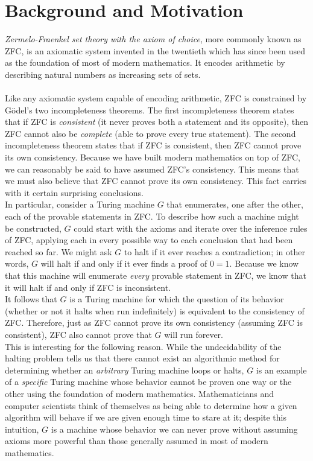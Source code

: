 \documentclass[11pt]{report}
\begin{document}
\section{Background and Motivation \label{sec:background}}

\emph{Zermelo-Fraenkel set theory with the axiom of choice}, more commonly known as ZFC, is an axiomatic system invented in the twentieth which has since been used as the foundation of most of modern mathematics. It encodes arithmetic by describing natural numbers as increasing sets of sets. \\
\\
Like any axiomatic system capable of encoding arithmetic, ZFC is constrained by G\"{o}del's two incompleteness theorems. The first incompleteness theorem states that if ZFC is \emph{consistent} (it never proves both a statement and its opposite), then ZFC cannot also be \emph{complete} (able to prove every true statement). The second incompleteness theorem states that if ZFC is consistent, then ZFC cannot prove its own consistency. Because we have built modern mathematics on top of ZFC, we can reasonably be said to have assumed ZFC's consistency. This means that we must also believe that ZFC cannot prove its own consistency. This fact carries with it certain surprising conclusions. \\

In particular, consider a Turing machine $G$ that enumerates, one after the other, each of the provable statements in ZFC. To describe how such a machine might be constructed, $G$ could start with the axioms and iterate over the inference rules of ZFC, applying each in every possible way to each conclusion that had been reached so far. We might ask $G$ to halt if it ever reaches a contradiction; in other words, $G$ will halt if and only if it ever finds a proof of $0 = 1$. Because we know that this machine will enumerate \emph{every} provable statement in ZFC, we know that it will halt if and only if ZFC is inconsistent. \\

It follows that $G$ is a Turing machine for which the question of its behavior (whether or not it halts when run indefinitely) is equivalent to the consistency of ZFC. Therefore, just as ZFC cannot prove its own consistency (assuming ZFC is consistent), ZFC also cannot prove that $G$ will run forever. \\

This is interesting for the following reason. While the undecidability of the halting problem tells us that there cannot exist an algorithmic method for determining whether an \emph{arbitrary} Turing machine loops or halts, $G$ is an example of a \emph{specific} Turing machine whose behavior cannot be proven one way or the other using the foundation of modern mathematics. Mathematicians and computer scientists think of themselves as being able to determine how a given algorithm will behave if we are given enough time to stare at it; despite this intuition, $G$ is a machine whose behavior we can never prove without assuming axioms more powerful than those generally assumed in most of modern mathematics. \\
\end{document}

